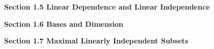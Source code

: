 \documentclass[11pt,largemargins]{homework}
\begin{document}
\question

\question

\question

\question


\hfill 

\textbf{\large{Section 1.5} Linear Dependence and Linear Independence}
\setcounter{questionCounter}{0}
\question

\question

\question

\question

\question


\hfill 

\textbf{\large{Section 1.6} Bases and Dimension}
\setcounter{questionCounter}{0}
\question

\question

\question

\question

\question


\hfill 

\textbf{\large{Section 1.7} Maximal Linearly Independent Subsets}
\setcounter{questionCounter}{0}
\question

\question

\question

\question

\question

\question

\question

\question

\question

\question
\end{document}
